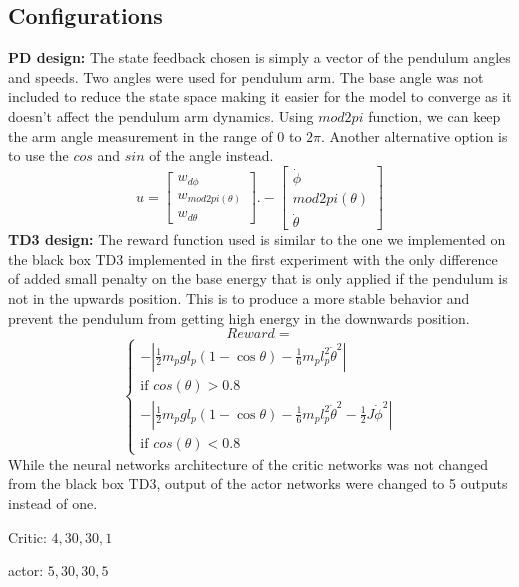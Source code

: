 \documentclass{LTHtwocol} %
\begin{document}
\subsection{Configurations}
\textbf{PD design:} The state feedback chosen is simply a vector of the pendulum angles and speeds. Two angles were used for pendulum arm. The base angle was not included to reduce the state space making it easier for the model to converge as it doesn't affect the pendulum arm dynamics. Using $mod2pi$ function, we can keep the arm angle measurement in the range of $0$ to $2 \pi$. Another alternative option is to use the $cos$ and $sin$ of the angle instead.
\begin{equation}
    u = \begin{bmatrix}
        w_{d\phi} \\ w_{mod2pi(\theta)} \\ w_{d\theta}
    \end{bmatrix}
    .- \begin{bmatrix}
        \dot \phi \\ mod2pi(\theta) \\ \dot \theta
    \end{bmatrix}
\end{equation}
\textbf{TD3 design:}
The reward function used is similar to the one we implemented on the black box TD3 implemented in the first experiment with the only difference of added small penalty on the base energy that is only applied if the pendulum is not in the upwards position. This is to produce a more stable behavior and prevent the pendulum from getting high energy in the downwards position.
\[Reward= \]
\begin{equation}
    \begin{cases}
    -|\frac{1}{2}m_p g l_p (1-\cos\theta) - \frac{1}{6} m_p l_p^2 \dot{\theta}^2| \\ \text{if} \,\, cos(\theta)>0.8
    \\ -|\frac{1}{2}m_p g l_p (1-\cos\theta) - \frac{1}{6} m_p l_p^2 \dot{\theta}^2 - \frac{1}{2}J\dot \phi^2 | \\ \text{if} \,\, cos(\theta)<0.8
\end{cases}
\label{reward}
\end{equation}
While the neural networks architecture of the critic networks was not changed from the black box TD3, output of the actor networks were changed to 5 outputs instead of one.

Critic:  $4,30,30,1$

actor: $5,30,30,5$
\end{document}
